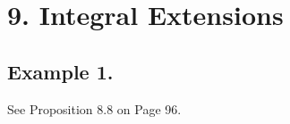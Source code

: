 \section{9. Integral Extensions}

\subsection{Example 1.}

See \cite{kemper2009course} Proposition 8.8 on Page 96.